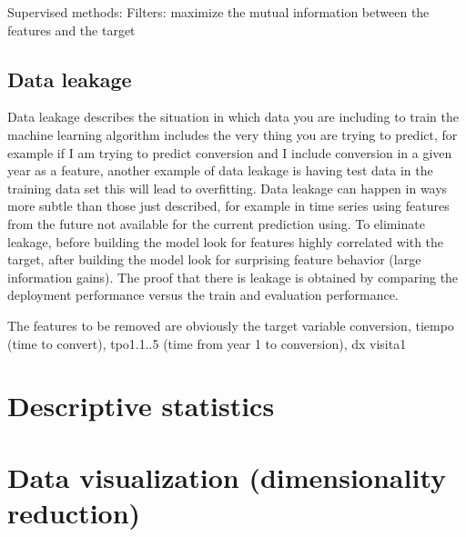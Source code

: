 \documentclass[12pt]{report}
\begin{document}
Supervised methods: Filters: maximize the mutual information between the features and the target

\subsection{Data leakage}
Data leakage describes the situation in which data you are including to train the machine learning algorithm includes the very thing you are trying to predict, for example if I am trying to predict conversion and I include conversion in a given year as a feature, another example of data leakage is having test data in the training data set this will lead to overfitting. Data leakage can happen in ways more subtle than those just described, for example in time series using features from the future not available for the current prediction using. To eliminate leakage, before building the  model look for features highly correlated with the target, after building the model look for surprising feature behavior (large information gains). The proof that there is leakage is obtained by comparing the deployment performance versus the train and evaluation performance. 

The features to be removed are obviously the target variable conversion, tiempo (time to convert), tpo1.1..5 (time from year 1 to conversion), dx visita1

\section{Descriptive statistics}

\section{Data visualization (dimensionality reduction)}
\end{document}

